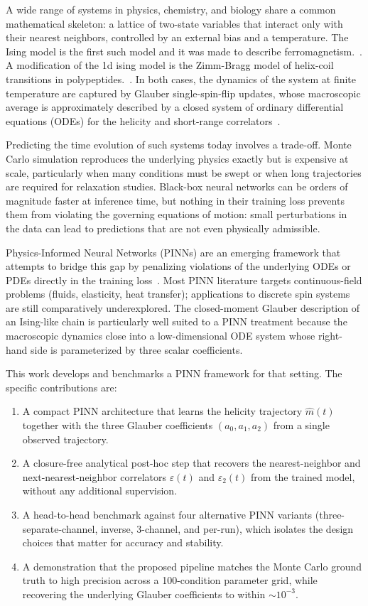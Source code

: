 \documentclass[conference]{IEEEtran}
\newcommand{\mhat}{\hat m(t)}
\newcommand{\eps}{\varepsilon}
\newcommand{\epstwo}{\varepsilon_2}
\begin{document}
A wide range of systems in physics, chemistry, and biology share a common
mathematical skeleton: a lattice of two-state variables that interact only
with their nearest neighbors, controlled by an external bias and a
temperature. The Ising model is the first such model and it was made to describe
ferromagnetism.~\cite{landau-stat}. A modification of the 1d ising model is the Zimm-Bragg model
 of helix-coil transitions in polypeptides.~\cite{zimmbragg1959}. In both cases, the dynamics of the
system at finite temperature are captured by Glauber single-spin-flip
updates, whose macroscopic average is approximately described by a closed system of
ordinary differential equations (ODEs) for the helicity and short-range
correlators~\cite{glauber1963,allahverdyan2009kinetics}.

Predicting the time evolution of such systems today involves a trade-off.
Monte Carlo simulation reproduces the underlying physics exactly but is
expensive at scale, particularly when many conditions must be swept or
when long trajectories are required for relaxation studies. Black-box
neural networks can be orders of magnitude faster at inference time, but
nothing in their training loss prevents them from violating the governing
equations of motion: small perturbations in the data can lead to
predictions that are not even physically admissible.

Physics-Informed Neural Networks (PINNs) are an emerging framework that
attempts to bridge this gap by penalizing violations of the underlying
ODEs or PDEs directly in the training loss~\cite{raissi2019pinn}. Most
PINN literature targets continuous-field problems (fluids, elasticity,
heat transfer); applications to discrete spin systems are still comparatively underexplored.
The closed-moment Glauber description of an Ising-like chain is
particularly well suited to a PINN treatment because the macroscopic
dynamics close into a low-dimensional ODE system whose right-hand side is
parameterized by three scalar coefficients.

This work develops and benchmarks a PINN framework for that setting. The
specific contributions are:

\begin{enumerate}
  \item A compact PINN architecture that learns the helicity
    trajectory $\mhat$ together with the three Glauber coefficients
    $(a_0, a_1, a_2)$ from a single observed trajectory.
  \item A closure-free analytical post-hoc step that recovers the
    nearest-neighbor and next-nearest-neighbor correlators
    $\eps(t)$ and $\epstwo(t)$ from the trained model, without any
    additional supervision.
  \item A head-to-head benchmark against four alternative PINN variants
    (three-separate-channel, inverse, 3-channel, and per-run), which
    isolates the design choices that matter for accuracy and stability.
  \item A demonstration that the proposed pipeline matches the
    Monte Carlo ground truth to high precision across a 100-condition
    parameter grid, while recovering the underlying Glauber coefficients
    to within $\sim\!10^{-3}$.
\end{enumerate}
\end{document}
